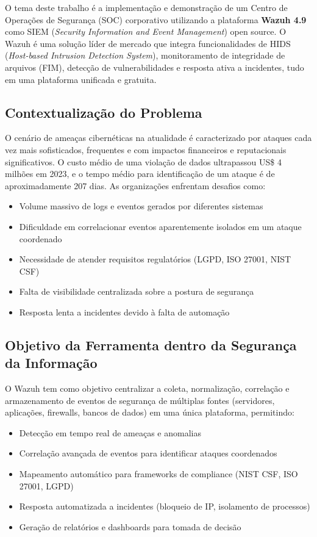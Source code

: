 \documentclass[12pt,a4paper]{article}
\begin{document}
    O tema deste trabalho é a implementação e demonstração de um Centro de Operações de Segurança (SOC) corporativo utilizando a plataforma \textbf{Wazuh 4.9} como SIEM (\textit{Security Information and Event Management}) open source. O Wazuh é uma solução líder de mercado que integra funcionalidades de HIDS (\textit{Host-based Intrusion Detection System}), monitoramento de integridade de arquivos (FIM), detecção de vulnerabilidades e resposta ativa a incidentes, tudo em uma plataforma unificada e gratuita.

    \subsection{Contextualização do Problema}

    O cenário de ameaças cibernéticas na atualidade é caracterizado por ataques cada vez mais sofisticados, frequentes e com impactos financeiros e reputacionais significativos. O custo médio de uma violação de dados ultrapassou US\$ 4 milhões em 2023, e o tempo médio para identificação de um ataque é de aproximadamente 207 dias. As organizações enfrentam desafios como:

    \begin{itemize}
        \item Volume massivo de logs e eventos gerados por diferentes sistemas
        \item Dificuldade em correlacionar eventos aparentemente isolados em um ataque coordenado
        \item Necessidade de atender requisitos regulatórios (LGPD, ISO 27001, NIST CSF)
        \item Falta de visibilidade centralizada sobre a postura de segurança
        \item Resposta lenta a incidentes devido à falta de automação
    \end{itemize}

    \subsection{Objetivo da Ferramenta dentro da Segurança da Informação}

    O Wazuh tem como objetivo centralizar a coleta, normalização, correlação e armazenamento de eventos de segurança de múltiplas fontes (servidores, aplicações, firewalls, bancos de dados) em uma única plataforma, permitindo:

    \begin{itemize}
        \item Detecção em tempo real de ameaças e anomalias
        \item Correlação avançada de eventos para identificar ataques coordenados
        \item Mapeamento automático para frameworks de compliance (NIST CSF, ISO 27001, LGPD)
        \item Resposta automatizada a incidentes (bloqueio de IP, isolamento de processos)
        \item Geração de relatórios e dashboards para tomada de decisão
    \end{itemize}
\end{document}
